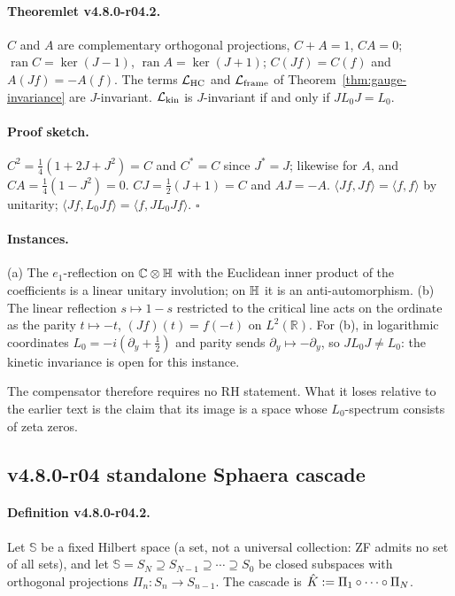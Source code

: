 \paragraph{Theoremlet v4.8.0-r04.2.}
\(C\) and \(A\) are complementary orthogonal projections, \(C+A=1\), \(CA=0\);
\(\operatorname{ran}C=\ker(J-1)\), \(\operatorname{ran}A=\ker(J+1)\); \(C(Jf)=C(f)\) and
\(A(Jf)=-A(f)\).  The terms \(\mathcal L_{\rm HC}\) and \(\mathcal L_{\rm frame}\) of
Theorem~\ref{thm:gauge-invariance} are \(J\)-invariant.  \(\mathcal L_{\rm kin}\) is
\(J\)-invariant if and only if \(JL_0J=L_0\).

\paragraph{Proof sketch.}
\(C^2=\tfrac14(1+2J+J^2)=C\) and \(C^*=C\) since \(J^*=J\); likewise for \(A\), and
\(CA=\tfrac14(1-J^2)=0\).  \(CJ=\tfrac12(J+1)=C\) and \(AJ=-A\).  \(\langle Jf,Jf\rangle=\langle
f,f\rangle\) by unitarity; \(\langle Jf,L_0Jf\rangle=\langle f,JL_0Jf\rangle\).  \(\square\)

\paragraph{Instances.}
(a) The \(e_1\)-reflection on \(\mathbb C\otimes\mathbb{H}\) with the Euclidean inner product of the
coefficients is a linear unitary involution; on \(\mathbb{H}\) it is an anti-automorphism.
(b) The linear reflection \(s\mapsto1-s\) restricted to the critical line acts on the ordinate as
the parity \(t\mapsto-t\), \((Jf)(t)=f(-t)\) on \(L^2(\mathbb R)\).  For (b), in logarithmic
coordinates \(L_0=-i(\partial_y+\tfrac12)\) and parity sends \(\partial_y\mapsto-\partial_y\), so
\(JL_0J\neq L_0\): the kinetic invariance is open for this instance.

The compensator therefore requires no RH statement.  What it loses relative to the earlier
text is the claim that its image is a space whose \(L_0\)-spectrum consists of zeta zeros.

\subsection*{v4.8.0-r04 standalone Sphaera cascade}
\label{subsec:v480-r04-standalone-cascade}

\paragraph{Definition v4.8.0-r04.2.}
Let \(\mathbb S\) be a fixed Hilbert space (a set, not a universal collection: ZF admits no
set of all sets), and let \(\mathbb S=S_N\supseteq S_{N-1}\supseteq\cdots\supseteq S_0\) be
closed subspaces with orthogonal projections \(\Pi_n:S_n\to S_{n-1}\).  The cascade is
\(\hat{K}:=\Pi_1\circ\cdots\circ\Pi_N\).

